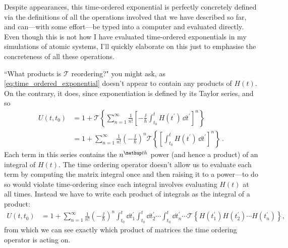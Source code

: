 Despite appearances, this time-ordered exponential is perfectly concretely defined via the definitions of all the operations involved that we have described so far, and can---with some effort---be typed into a computer and evaluated directly. Even though this is not how I have evaluated time-ordered exponentials in my simulations of atomic systems, I'll quickly elaborate on this just to emphasise the concreteness of all these operations.

``What products is $\mathcal{T}$ reordering?" you might ask, as \eqref{eq:time_ordered_exponential} doesn't appear to contain any products of $H(t)$. On the contrary, it does, since exponentiation is defined by its Taylor series, and so
\begin{align}
U(t, t_0) &= 1 + \mathcal{T}\left\{\sum_{n=1}^\infty \frac1 {n!}\left[ -\frac \ii \hbar \int_{t_0}^t H(t^\prime)\,\dd t^\prime\right]^n\right\}\\
&= 1 + \sum_{n=1}^\infty \frac1 {n!}  \left(-\frac \ii \hbar \right)^n \mathcal{T}\left\{\left[\int_{t_0}^t H(t^\prime)\,\dd t^\prime\right]^n\right\}\,.
\end{align}
Each term in this series contains the $n^\up{th}$ power (and hence a product) of an integral of $H(t)$. The time ordering operator doesn't allow us to evaluate each term by computing the matrix integral once and then raising it to a power---to do so would violate time-ordering since each integral involves evaluating $H(t)$ at all times. Instead we have to write each product of integrals as the integral of a product:
\begin{align}
U(t, t_0)
&= 1 + \sum_{n=1}^\infty \frac1 {n!}  \left(-\frac \ii \hbar \right)^n
\int_{t_0}^t \dd t_1^\prime
\int_{t_0}^t \dd t_2^\prime
\cdots
\int_{t_0}^t \dd t^\prime_n
\cdots
\mathcal{T}\left\{H(t_1^\prime)H(t_2^\prime)\cdots H(t_n^\prime)\right\},
\end{align}
from which we can see exactly which product of matrices the time ordering operator is acting on.


